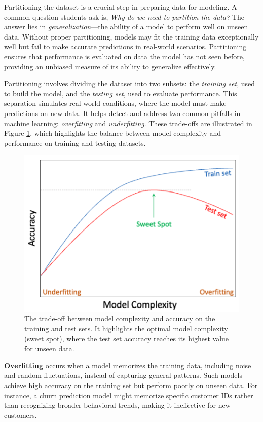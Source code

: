 \documentclass[
]{book}
\theoremstyle{definition}
\theoremstyle{definition}
\theoremstyle{definition}
\theoremstyle{definition}
\theoremstyle{remark}
\begin{document}
Partitioning the dataset is a crucial step in preparing data for modeling. A common question students ask is, \emph{Why do we need to partition the data?} The answer lies in \emph{generalization}---the ability of a model to perform well on unseen data. Without proper partitioning, models may fit the training data exceptionally well but fail to make accurate predictions in real-world scenarios. Partitioning ensures that performance is evaluated on data the model has not seen before, providing an unbiased measure of its ability to generalize effectively.

Partitioning involves dividing the dataset into two subsets: the \emph{training set}, used to build the model, and the \emph{testing set}, used to evaluate performance. This separation simulates real-world conditions, where the model must make predictions on new data. It helps detect and address two common pitfalls in machine learning: \emph{overfitting} and \emph{underfitting}. These trade-offs are illustrated in Figure \ref{fig:model-complexity}, which highlights the balance between model complexity and performance on training and testing datasets.

\begin{figure}

{\centering \includegraphics[width=0.65\linewidth]{images/model_complexity} 

}

\caption{The trade-off between model complexity and accuracy on the training and test sets. It highlights the optimal model complexity (sweet spot), where the test set accuracy reaches its highest value for unseen data.}\label{fig:model-complexity}
\end{figure}

\textbf{Overfitting} occurs when a model memorizes the training data, including noise and random fluctuations, instead of capturing general patterns. Such models achieve high accuracy on the training set but perform poorly on unseen data. For instance, a churn prediction model might memorize specific customer IDs rather than recognizing broader behavioral trends, making it ineffective for new customers.
\end{document}

